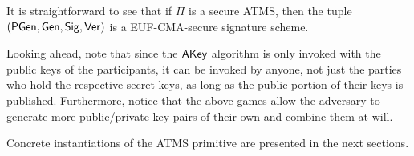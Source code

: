 It is straightforward to see that if
$\Pi$
is a secure ATMS, then
the tuple $( \textsf{PGen}, \mathsf{Gen}, \mathsf{Sig}, \mathsf{Ver} )$ is a \textsf{EUF-CMA}-secure
signature scheme.

Looking ahead, note that since the $\textsf{AKey}$ algorithm is only invoked with
the public keys of the participants, it can be invoked by anyone, not just the
parties who hold the respective secret keys, as long as the public portion of
their keys is published. Furthermore, notice that the above games allow the adversary
to generate more public/private key pairs of their own and combine them at will.

Concrete instantiations of the ATMS primitive are
presented in the next sections.
